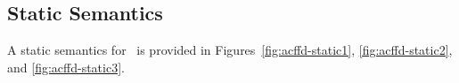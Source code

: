 %
%
%
%

\subsection{Static Semantics}\label{acffd-static}
A static semantics for \acffdcore\ is provided in
Figures~\ref{fig:acffd-static1}, \ref{fig:acffd-static2},
and \ref{fig:acffd-static3}.

